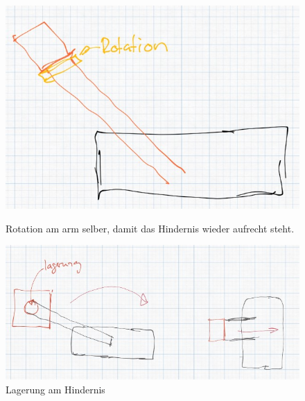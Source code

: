 \begin{figure}[h!]
    \centering
    \begin{minipage}{0.45\textwidth}
        \centering
        \includegraphics[width=\textwidth]{img/technologierecherche/Rotation/ueberkopf_griff_gelagert.jpg}
        \caption{Rotation am arm selber, damit das Hindernis wieder aufrecht steht.}
        \label{img:tech_ueberkopf_griff_gelagert}
    \end{minipage}
    \hfill
    \begin{minipage}{0.45\textwidth}
        \centering
        \includegraphics[width=\textwidth]{img/technologierecherche/Rotation/ueberkopf_objekt_gelagert.jpg}
        \caption{Lagerung am Hindernis } 
        \label{img:tech_ueberkopf_objekt_gelagert}
    \end{minipage}
\end{figure}

